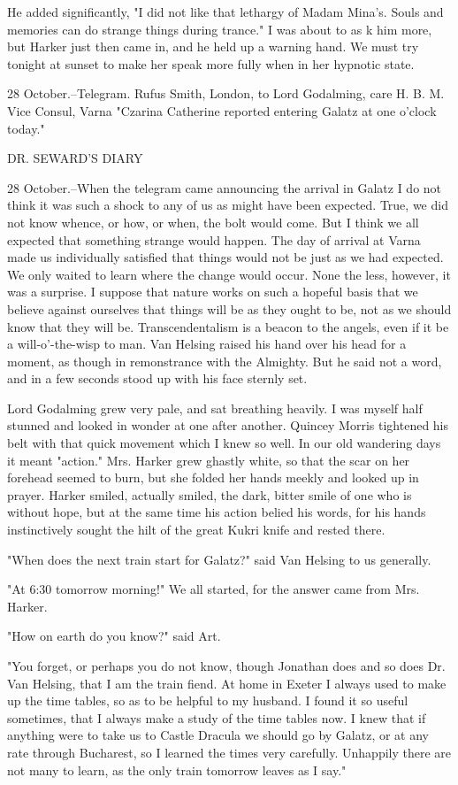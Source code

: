 He added significantly, "I did not like that lethargy of Madam Mina's. Souls and memories can do strange things during trance." I was about to as k him more, but Harker just then came in, and he held up a warning hand. We must try tonight at sunset to make her speak more fully when in her hypnotic state. 

28 October.--Telegram. Rufus Smith, London, to Lord Godalming, care H. B. M. Vice Consul, Varna "Czarina Catherine reported entering Galatz at one o'clock today." 

DR. SEWARD'S DIARY 

28 October.--When the telegram came announcing the arrival in Galatz I do not think it was such a shock to any of us as might have been expected. True, we did not know whence, or how, or when, the bolt would come. But I think we all expected that something strange would happen. The day of arrival at Varna made us individually satisfied that things would not be just as we had expected. We only waited to learn where the change would occur. None the less, however, it was a surprise. I suppose that nature works on such a hopeful basis that we believe against ourselves that things will be as they ought to be, not as we should know that they will be. Transcendentalism is a beacon to the angels, even if it be a will-o'-the-wisp to man. Van Helsing raised his hand over his head for a moment, as though in remonstrance with the Almighty. But he said not a word, and in a few seconds stood up with his face sternly set. 

Lord Godalming grew very pale, and sat breathing heavily. I was myself half stunned and looked in wonder at one after another. Quincey Morris tightened his belt with that quick movement which I knew so well. In our old wandering days it meant "action." Mrs. Harker grew ghastly white, so that the scar on her forehead seemed to burn, but she folded her hands meekly and looked up in prayer. Harker smiled, actually smiled, the dark, bitter smile of one who is without hope, but at the same time his action belied his words, for his hands instinctively sought the hilt of the great Kukri knife and rested there. 

"When does the next train start for Galatz?" said Van Helsing to us generally. 

"At 6:30 tomorrow morning!" We all started, for the answer came from Mrs. Harker. 

"How on earth do you know?" said Art. 

"You forget, or perhaps you do not know, though Jonathan does and so does Dr. Van Helsing, that I am the train fiend. At home in Exeter I always used to make up the time tables, so as to be helpful to my husband. I found it so useful sometimes, that I always make a study of the time tables now. I knew that if anything were to take us to Castle Dracula we should go by Galatz, or at any rate through Bucharest, so I learned the times very carefully. Unhappily there are not many to learn, as the only train tomorrow leaves as I say." 

